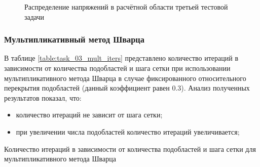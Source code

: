 \documentclass[a4paper]{article}
\begin{document}
\begin{figure}[h]
\caption{Распределение напряжений в расчётной области третьей тестовой задачи}
\label{fig:task_03_basic_pressure_distribution}
\end{figure}

\newpage

\subsubsection{Мультипликативный метод Шварца}

В таблице \ref{table:task_03_mult_iters} представлено количество итераций в зависимости от количества подобластей и шага сетки при использовании мультипликативного метода Шварца в случае фиксированного относительного перекрытия подобластей (данный коэффициент равен 0.3). Анализ полученных результатов показал, что:
\begin{itemize}
\item количество итераций не зависит от шага сетки;
\item при увеличении числа подобластей количество итераций увеличивается;
\end{itemize}

\begin{table}[h]
\caption{Количество итераций в зависимости от количества подобластей и шага сетки для мультипликативного метода Шварца}
\label{table:task_03_mult_iters}
\end{table}
\end{document}
